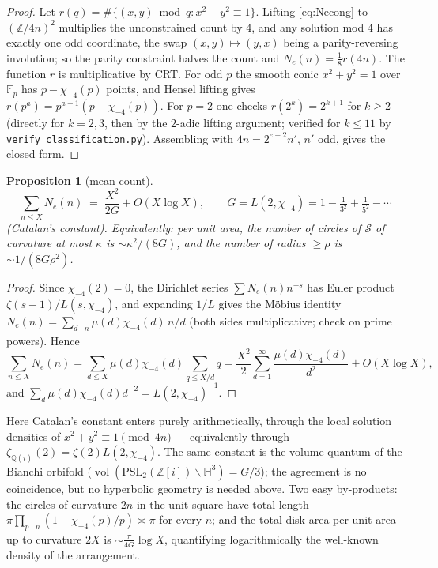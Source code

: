 \documentclass[11pt]{amsart}
\numberwithin{equation}{section}
\theoremstyle{plain}
\newtheorem{proposition}[theorem]{Proposition}
\theoremstyle{definition}
\theoremstyle{remark}
\newcommand{\Q}{\mathbb{Q}}
\newcommand{\Z}{\mathbb{Z}}
\newcommand{\HH}{\mathbb{H}}
\newcommand{\Zi}{\Z[i]}
\newcommand{\PSL}{\mathrm{PSL}}
\newcommand{\Sarr}{\mathcal{S}}
\begin{document}
\begin{proof}
Let $r(q) = \#\{(x,y) \bmod q : x^2 + y^2 \equiv 1\}$.  Lifting
\eqref{eq:Necong} to $(\Z/4n)^2$ multiplies the unconstrained count by
$4$, and any solution mod $4$ has exactly one odd coordinate, the swap
$(x, y) \mapsto (y, x)$ being a parity-reversing involution; so the
parity constraint halves the count and $N_e(n) = \tfrac18 r(4n)$.  The
function $r$ is multiplicative by CRT.  For odd $p$ the smooth conic
$x^2 + y^2 = 1$ over $\mathbb{F}_p$ has $p - \chi_{-4}(p)$ points, and
Hensel lifting gives $r(p^a) = p^{a-1}(p - \chi_{-4}(p))$.  For
$p = 2$ one checks $r(2^k) = 2^{k+1}$ for $k \ge 2$ (directly for
$k = 2, 3$, then by the $2$-adic lifting argument; verified for
$k \le 11$ by \texttt{verify\_classification.py}).  Assembling with
$4n = 2^{e+2} n'$, $n'$ odd, gives the closed form.
\end{proof}

\begin{proposition}[mean count]\label{prop:catalan}
\[
  \sum_{n \le X} N_e(n) \;=\; \frac{X^2}{2G} + O(X\log X),
  \qquad G = L(2, \chi_{-4}) = 1 - \tfrac{1}{3^2} + \tfrac{1}{5^2}
  - \cdots
\]
\emph{(Catalan's constant)}.  Equivalently: per unit area, the number of
circles of $\Sarr$ of curvature at most $\kappa$ is
$\sim \kappa^2/(8G)$, and the number of radius $\ge \rho$ is
$\sim 1/(8G\rho^2)$.
\end{proposition}

\begin{proof}
Since $\chi_{-4}(2) = 0$, the Dirichlet series $\sum N_e(n)n^{-s}$ has
Euler product $\zeta(s-1)/L(s, \chi_{-4})$, and expanding
$1/L$ gives the M\"obius identity
$N_e(n) = \sum_{d \mid n} \mu(d)\chi_{-4}(d)\, n/d$ (both sides
multiplicative; check on prime powers).  Hence
\[
  \sum_{n \le X} N_e(n)
  = \sum_{d \le X} \mu(d)\chi_{-4}(d) \sum_{q \le X/d} q
  = \frac{X^2}{2}\sum_{d = 1}^{\infty}
  \frac{\mu(d)\chi_{-4}(d)}{d^2} + O(X\log X),
\]
and $\sum_d \mu(d)\chi_{-4}(d)d^{-2} = L(2, \chi_{-4})^{-1}$.
\end{proof}

Here Catalan's constant enters purely arithmetically, through the local
solution densities of $x^2 + y^2 \equiv 1 \pmod{4n}$ --- equivalently
through $\zeta_{\Q(i)}(2) = \zeta(2)L(2, \chi_{-4})$.  The same constant
is the volume quantum of the Bianchi orbifold
($\operatorname{vol}(\PSL_2(\Zi)\backslash\HH^3) = G/3$); the agreement
is no coincidence, but no hyperbolic geometry is needed above.  Two easy
by-products: the circles of curvature $2n$ in the unit square have total
length $\pi\prod_{p \mid n}(1 - \chi_{-4}(p)/p) \asymp \pi$ for every
$n$; and the total disk area per unit area up to curvature $2X$ is
$\sim \frac{\pi}{4G}\log X$, quantifying logarithmically the well-known
density of the arrangement.
\end{document}
